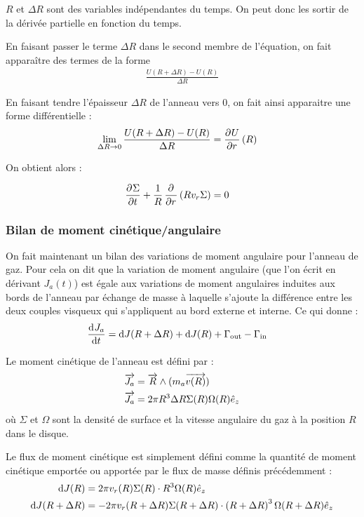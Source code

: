 $R$ et $\Delta R$ sont des variables indépendantes du temps. On peut donc les sortir de la dérivée partielle en fonction du temps. 

En faisant passer le terme $\Delta R$ dans le second membre de l'équation, on fait apparaître des termes de la forme 
\begin{align*}
\frac{U(R+\Delta R) - U(R)}{\Delta R}
\end{align*}

En faisant tendre l'épaisseur $\Delta R$ de l'anneau vers 0, on fait ainsi apparaitre une forme différentielle : 
\begin{align*}
\lim_{\Delta R \rightarrow 0} \frac{U(R+\Delta R) - U(R)}{\Delta R} &= \mathinner{ \dfrac{\partial{^{}}U}{\partial{{r}^{}}} }(R)
\end{align*}

On obtient alors :
\begin{important}
\begin{align}
\mathinner{ \dfrac{\partial{^{}}\Sigma}{\partial{{t}^{}}} } + \frac{1}{R}\mathinner{ \dfrac{\partial{^{}}}{\partial{{r}^{}}} }\left(R v_r \Sigma\right)&=0\label{eq:conservation_masse}
\end{align}
\end{important}

\subsubsection{Bilan de moment cinétique/angulaire}
On fait maintenant un bilan des variations de moment angulaire pour l'anneau de gaz. Pour cela on dit que la variation de moment angulaire (que l'on écrit en dérivant $J_a(t)$) est égale aux variations de moment angulaires induites aux bords de l'anneau par échange de masse à laquelle s'ajoute la différence entre les deux couples visqueux qui s'appliquent au bord externe et interne. Ce qui donne : 
\begin{align}
\mathinner{ \dfrac{\operatorname{d \!}{^{}}J_a}{\operatorname{d \!}{{t}^{}}} } &= \operatorname{d \!} J(R+\Delta R) + \operatorname{d \!} J(R) + \Gamma_\text{out} - \Gamma_\text{in}\label{eq:cons_J_a}
\end{align}

Le moment cinétique de l'anneau est défini par :
\begin{align}
\vect{J_a} &= \vect{R} \wedge (m_a\vect{v(R)}) \nonumber\\
\vect{J_a} &= 2\pi R^3 \Delta R \Sigma(R)\Omega(R)\hat{e}_z\label{eq:J_a}
\end{align}
où $\Sigma$ et $\Omega$ sont la densité de surface et la vitesse angulaire du gaz à la position $R$ dans le disque.

Le flux de moment cinétique est simplement défini comme la quantité de moment cinétique emportée ou apportée par le flux de masse définis précédemment  :
\begin{subequations}
\begin{align}
\operatorname{d \!} J(R) &= 2\pi v_r(R) \Sigma(R)\cdot R^3\Omega(R)\hat{e}_z\label{eq:dJ_in}\\
\operatorname{d \!} J(R+\Delta R) &= -2\pi v_r(R+\Delta R) \Sigma(R+\Delta R)\cdot \left(R+\Delta R\right)^3\Omega(R+\Delta R)\hat{e}_z\label{eq:dJ_out}
\end{align}\label{eq:dJ}
\end{subequations}


